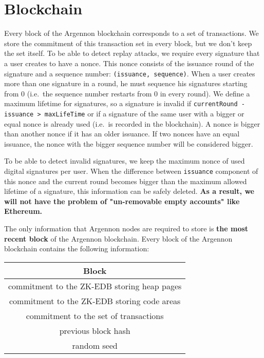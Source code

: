 \documentclass[11pt, a4paper]{report}
\begin{document}
    \section{Blockchain}\label{sec:blockchain}

    Every block of the Argennon blockchain corresponds to a set of transactions. We store the commitment of this
    transaction set in every block, but we don't keep the set itself. To be able to detect replay attacks, we require
    every signature that a user creates to have a nonce. This nonce consists of the issuance round of the signature
    and a sequence number: \texttt{(issuance,\ sequence)}. When a user creates more than one signature in a round, he
    must sequence his signatures starting from 0 (i.e.~the sequence number restarts from 0 in every round). We define
    a maximum lifetime for signatures, so a signature is invalid if \texttt{currentRound - issuance > maxLifeTime} or
    if a signature of the same user with a bigger or equal nonce is already used
    (i.e.~is recorded in the blockchain). A nonce is bigger than another nonce if it has an older issuance. If two
    nonces have an equal issuance, the nonce with the bigger sequence number will be considered bigger.

    To be able to detect invalid signatures, we keep the maximum nonce of used digital signatures per user. When the
    difference between \texttt{issuance} component of this nonce and the current round becomes bigger than the
    maximum allowed lifetime of a signature, this information can be safely deleted. \textbf{As a result, we will not
    have the problem of "un-removable empty accounts" like Ethereum.}

    The only information that Argennon nodes are required to store is \textbf{the most recent block} of the Argennon
    blockchain. Every block of the Argennon blockchain contains the following information:

    \begin{center}
        \begin{tabular}{||c||}
            \hline
            Block \\ [0.5ex]
            \hline\hline
            commitment to the ZK-EDB storing heap pages \\ [0.7ex]
            commitment to the ZK-EDB storing code areas \\ [0.7ex]
            commitment to the set of transactions       \\ [0.7ex]
            previous block hash                         \\ [0.7ex]
            random seed                                 \\ [0.7ex]
            \hline
        \end{tabular}
    \end{center}
\end{document}

